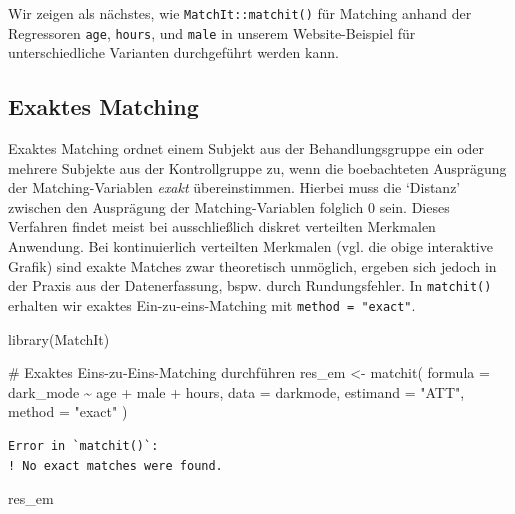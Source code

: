 \documentclass[
  a4paper,
  DIV=11,
  oneside]{scrreprt}
\newenvironment{Shaded}{\begin{snugshade}}{\end{snugshade}}
\newcommand{\AttributeTok}[1]{\textcolor[rgb]{0.40,0.45,0.13}{#1}}
\newcommand{\CommentTok}[1]{\textcolor[rgb]{0.37,0.37,0.37}{#1}}
\newcommand{\FunctionTok}[1]{\textcolor[rgb]{0.28,0.35,0.67}{#1}}
\newcommand{\NormalTok}[1]{\textcolor[rgb]{0.00,0.23,0.31}{#1}}
\newcommand{\OtherTok}[1]{\textcolor[rgb]{0.00,0.23,0.31}{#1}}
\newcommand{\SpecialCharTok}[1]{\textcolor[rgb]{0.37,0.37,0.37}{#1}}
\newcommand{\StringTok}[1]{\textcolor[rgb]{0.13,0.47,0.30}{#1}}
\begin{document}
Wir zeigen als nächstes, wie \texttt{MatchIt::matchit()} für Matching
anhand der Regressoren \texttt{age}, \texttt{hours}, und \texttt{male}
in unserem Website-Beispiel für unterschiedliche Varianten durchgeführt
werden kann.

\hypertarget{exaktes-matching}{%
\subsection{Exaktes Matching}\label{exaktes-matching}}

Exaktes Matching ordnet einem Subjekt aus der Behandlungsgruppe ein oder
mehrere Subjekte aus der Kontrollgruppe zu, wenn die boebachteten
Ausprägung der Matching-Variablen \emph{exakt} übereinstimmen. Hierbei
muss die `Distanz' zwischen den Ausprägung der Matching-Variablen
folglich \(0\) sein. Dieses Verfahren findet meist bei ausschließlich
diskret verteilten Merkmalen Anwendung. Bei kontinuierlich verteilten
Merkmalen (vgl. die obige interaktive Grafik) sind exakte Matches zwar
theoretisch unmöglich, ergeben sich jedoch in der Praxis aus der
Datenerfassung, bspw. durch Rundungsfehler. In \texttt{matchit()}
erhalten wir exaktes Ein-zu-eins-Matching mit
\texttt{method\ =\ "exact"}.

\begin{Shaded}
\begin{Highlighting}[]
\FunctionTok{library}\NormalTok{(MatchIt)}

\CommentTok{\# Exaktes Eins{-}zu{-}Eins{-}Matching durchführen}
\NormalTok{res\_em }\OtherTok{\textless{}{-}} \FunctionTok{matchit}\NormalTok{(}
  \AttributeTok{formula =}\NormalTok{ dark\_mode }\SpecialCharTok{\textasciitilde{}}\NormalTok{ age }\SpecialCharTok{+}\NormalTok{ male }\SpecialCharTok{+}\NormalTok{ hours, }
  \AttributeTok{data =}\NormalTok{ darkmode,}
  \AttributeTok{estimand =} \StringTok{"ATT"}\NormalTok{,}
  \AttributeTok{method =} \StringTok{"exact"}
\NormalTok{)}
\end{Highlighting}
\end{Shaded}

\begin{verbatim}
Error in `matchit()`:
! No exact matches were found.
\end{verbatim}

\begin{Shaded}
\begin{Highlighting}[]
\NormalTok{res\_em}
\end{Highlighting}
\end{Shaded}
\end{document}
